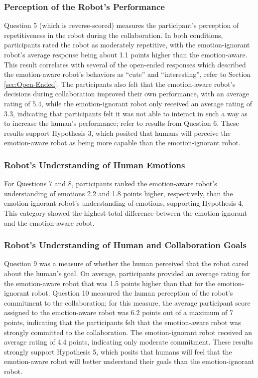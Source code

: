 \documentclass[12pt]{report}
\begin{document}
\subsubsection{Perception of the Robot's Performance} 
\label{sec:Performance}
Question 5 (which is reverse-scored) measures the participant's perception of
repetitiveness in the robot during the collaboration. In both conditions,
participants rated the robot as moderately repetitive, with the emotion-ignorant
robot's average response being about 1.1 points higher than the emotion-aware.
This result correlates with several of the open-ended responses which described
the emotion-aware robot's behaviors as ``cute'' and ``interesting'', refer to
Section \ref{sec:Open-Ended}. The participants also felt that the emotion-aware
robot's decisions during collaboration improved their own performance, with an
average rating of 5.4, while the emotion-ignorant robot only received an average
rating of 3.3, indicating that participants felt it was not able to interact in
such a way as to increase the human's performance; refer to results from
Question 6. These results support Hypothesis 3, which posited that humans will
perceive the emotion-aware robot as being more capable than the emotion-ignorant
robot.

\subsubsection{Robot's Understanding of Human Emotions} 
\label{sec:Emotions}
For Questions 7 and 8, participants ranked the emotion-aware robot's
understanding of emotions 2.2 and 1.8 points higher, respectively, than the
emotion-ignorant robot's understanding of emotions, supporting Hypothesis 4.
This category showed the highest total difference between the emotion-ignorant
and the emotion-aware robot.

\subsubsection{Robot's Understanding of Human and Collaboration Goals}
\label{sec:Goals}
Question 9 was a measure of whether the human perceived that the robot cared
about the human's goal. On average, participants provided an average rating for
the emotion-aware robot that was 1.5 points higher than that for the
emotion-ignorant robot. Question 10 measured the human perception of the
robot's commitment to the collaboration; for this measure, the average
participant score assigned to the emotion-aware robot was 6.2 points out of a
maximum of 7 points, indicating that the participants felt that the
emotion-aware robot was strongly committed to the collaboration. The
emotion-ignorant robot received an average rating of 4.4 points, indicating
only moderate commitment. These results strongly support Hypothesis 5, which
posits that humans will feel that the emotion-aware robot will better understand
their goals than the emotion-ignorant robot.
\end{document}
